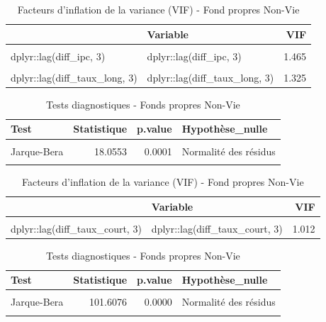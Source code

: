\documentclass[
]{article}
\begin{document}
\begin{longtable}[t]{llr}
\caption{\label{tab:unnamed-chunk-53}Facteurs d'inflation de la variance (VIF) - Fond propres Non-Vie}\\
\toprule
 & Variable & VIF\\
\midrule
\cellcolor{gray!10}{dplyr::lag(diff\_fonds\_propres, 1)} & \cellcolor{gray!10}{dplyr::lag(diff\_fonds\_propres, 1)} & \cellcolor{gray!10}{1.055}\\
dplyr::lag(diff\_ipc, 3) & dplyr::lag(diff\_ipc, 3) & 1.465\\
\cellcolor{gray!10}{dplyr::lag(diff\_taux\_court, 3)} & \cellcolor{gray!10}{dplyr::lag(diff\_taux\_court, 3)} & \cellcolor{gray!10}{1.622}\\
dplyr::lag(diff\_taux\_long, 3) & dplyr::lag(diff\_taux\_long, 3) & 1.325\\
\bottomrule
\end{longtable}

\begin{longtable}[t]{lrrl}
\caption{\label{tab:unnamed-chunk-54}Tests diagnostiques - Fonds propres Non-Vie}\\
\toprule
Test & Statistique & p.value & Hypothèse\_nulle\\
\midrule
\cellcolor{gray!10}{Ljung-Box} & \cellcolor{gray!10}{0.0381} & \cellcolor{gray!10}{0.8452} & \cellcolor{gray!10}{Pas d'autocorrélation}\\
Jarque-Bera & 18.0553 & 0.0001 & Normalité des résidus\\
\cellcolor{gray!10}{Breusch-Pagan} & \cellcolor{gray!10}{0.2348} & \cellcolor{gray!10}{0.8892} & \cellcolor{gray!10}{Homoscédasticité}\\
\bottomrule
\end{longtable}

\begin{longtable}[t]{llr}
\caption{\label{tab:unnamed-chunk-54}Facteurs d'inflation de la variance (VIF) - Fond propres Non-Vie}\\
\toprule
 & Variable & VIF\\
\midrule
\cellcolor{gray!10}{dplyr::lag(diff\_scr, 1)} & \cellcolor{gray!10}{dplyr::lag(diff\_scr, 1)} & \cellcolor{gray!10}{1.012}\\
dplyr::lag(diff\_taux\_court, 3) & dplyr::lag(diff\_taux\_court, 3) & 1.012\\
\bottomrule
\end{longtable}

\begin{longtable}[t]{lrrl}
\caption{\label{tab:unnamed-chunk-55}Tests diagnostiques - Fonds propres Non-Vie}\\
\toprule
Test & Statistique & p.value & Hypothèse\_nulle\\
\midrule
\cellcolor{gray!10}{Ljung-Box} & \cellcolor{gray!10}{0.0211} & \cellcolor{gray!10}{0.8846} & \cellcolor{gray!10}{Pas d'autocorrélation}\\
Jarque-Bera & 101.6076 & 0.0000 & Normalité des résidus\\
\cellcolor{gray!10}{Breusch-Pagan} & \cellcolor{gray!10}{2.7860} & \cellcolor{gray!10}{0.4258} & \cellcolor{gray!10}{Homoscédasticité}\\
\bottomrule
\end{longtable}
\end{document}
